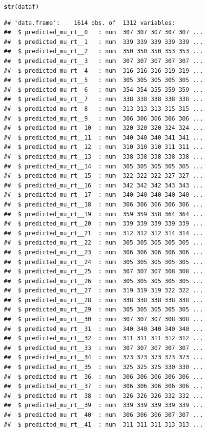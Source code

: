 \documentclass{article}\usepackage[]{graphicx}\usepackage[]{color}
\makeatletter
\newcommand{\hlstd}[1]{\textcolor[rgb]{0.345,0.345,0.345}{#1}}%
\newcommand{\hlkwd}[1]{\textcolor[rgb]{0.737,0.353,0.396}{\textbf{#1}}}%
\newenvironment{kframe}{%
 \def\at@end@of@kframe{}%
 \ifinner\ifhmode%
  \def\at@end@of@kframe{\end{minipage}}%
  \begin{minipage}{\columnwidth}%
 \fi\fi%
 \def\FrameCommand##1{\hskip\@totalleftmargin \hskip-\fboxsep
 \colorbox{shadecolor}{##1}\hskip-\fboxsep
     \hskip-\linewidth \hskip-\@totalleftmargin \hskip\columnwidth}%
 \MakeFramed {\advance\hsize-\width
   \@totalleftmargin\z@ \linewidth\hsize
   \@setminipage}}%
 {\par\unskip\endMakeFramed%
 \at@end@of@kframe}
\newenvironment{knitrout}{}{} %
\makeatother
\begin{document}
\begin{knitrout}
\begin{kframe}
\begin{alltt}
\hlkwd{str}\hlstd{(dataf)}
\end{alltt}
\begin{verbatim}
## 'data.frame':	1614 obs. of  1312 variables:
##  $ predicted_mu_rt__0   : num  307 307 307 307 307 ...
##  $ predicted_mu_rt__1   : num  339 339 339 339 339 ...
##  $ predicted_mu_rt__2   : num  350 350 350 353 353 ...
##  $ predicted_mu_rt__3   : num  307 307 307 307 307 ...
##  $ predicted_mu_rt__4   : num  316 316 316 319 319 ...
##  $ predicted_mu_rt__5   : num  305 305 305 305 305 ...
##  $ predicted_mu_rt__6   : num  354 354 355 359 359 ...
##  $ predicted_mu_rt__7   : num  338 338 338 338 338 ...
##  $ predicted_mu_rt__8   : num  313 313 313 315 315 ...
##  $ predicted_mu_rt__9   : num  306 306 306 306 306 ...
##  $ predicted_mu_rt__10  : num  320 320 320 324 324 ...
##  $ predicted_mu_rt__11  : num  340 340 340 341 341 ...
##  $ predicted_mu_rt__12  : num  310 310 310 311 311 ...
##  $ predicted_mu_rt__13  : num  338 338 338 338 338 ...
##  $ predicted_mu_rt__14  : num  305 305 305 305 305 ...
##  $ predicted_mu_rt__15  : num  322 322 322 327 327 ...
##  $ predicted_mu_rt__16  : num  342 342 342 343 343 ...
##  $ predicted_mu_rt__17  : num  340 340 340 340 340 ...
##  $ predicted_mu_rt__18  : num  306 306 306 306 306 ...
##  $ predicted_mu_rt__19  : num  359 359 358 364 364 ...
##  $ predicted_mu_rt__20  : num  339 339 339 339 339 ...
##  $ predicted_mu_rt__21  : num  312 312 312 314 314 ...
##  $ predicted_mu_rt__22  : num  305 305 305 305 305 ...
##  $ predicted_mu_rt__23  : num  306 306 306 306 306 ...
##  $ predicted_mu_rt__24  : num  305 305 305 305 305 ...
##  $ predicted_mu_rt__25  : num  307 307 307 308 308 ...
##  $ predicted_mu_rt__26  : num  305 305 305 305 305 ...
##  $ predicted_mu_rt__27  : num  319 319 319 322 322 ...
##  $ predicted_mu_rt__28  : num  338 338 338 338 338 ...
##  $ predicted_mu_rt__29  : num  305 305 305 305 305 ...
##  $ predicted_mu_rt__30  : num  307 307 307 308 308 ...
##  $ predicted_mu_rt__31  : num  340 340 340 340 340 ...
##  $ predicted_mu_rt__32  : num  311 311 311 312 312 ...
##  $ predicted_mu_rt__33  : num  307 307 307 307 307 ...
##  $ predicted_mu_rt__34  : num  373 373 373 373 373 ...
##  $ predicted_mu_rt__35  : num  325 325 325 330 330 ...
##  $ predicted_mu_rt__36  : num  306 306 306 306 306 ...
##  $ predicted_mu_rt__37  : num  306 306 306 306 306 ...
##  $ predicted_mu_rt__38  : num  326 326 326 332 332 ...
##  $ predicted_mu_rt__39  : num  339 339 339 339 339 ...
##  $ predicted_mu_rt__40  : num  306 306 306 307 307 ...
##  $ predicted_mu_rt__41  : num  311 311 311 313 313 ...

\end{verbatim}
\end{kframe}
\end{knitrout}
\end{document}
